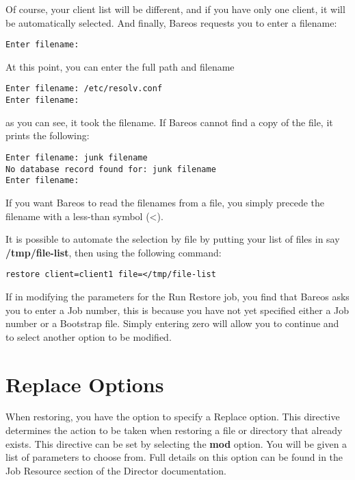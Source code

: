 Of course, your client list will be different, and if you have only one
client, it will be automatically selected. And finally, Bareos requests you to
enter a filename:

\footnotesize
\begin{verbatim}
Enter filename:
\end{verbatim}
\normalsize

At this point, you can enter the full path and filename

\footnotesize
\begin{verbatim}
Enter filename: /etc/resolv.conf
Enter filename:
\end{verbatim}
\normalsize

as you can see, it took the filename. If Bareos cannot find a copy of the
file, it prints the following:

\footnotesize
\begin{verbatim}
Enter filename: junk filename
No database record found for: junk filename
Enter filename:
\end{verbatim}
\normalsize

If you want Bareos to read the filenames from a file, you simply precede the
filename with a less-than symbol ({\textless}).

It is possible to automate the selection by file by putting your list of files
in say {\bf /tmp/file-list}, then using the following command:

\footnotesize
\begin{verbatim}
restore client=client1 file=</tmp/file-list
\end{verbatim}
\normalsize

If in modifying the parameters for the Run Restore job, you find that Bareos
asks you to enter a Job number, this is because you have not yet specified
either a Job number or a Bootstrap file. Simply entering zero will allow you
to continue and to select another option to be modified.

\label{Replace}

\section{Replace Options}

When restoring, you have the option to specify a Replace option.  This
directive determines the action to be taken when restoring a file or
directory that already exists.  This directive can be set by selecting
the {\bf mod} option.  You will be given a list of parameters to choose
from.  Full details on this option can be found in the Job Resource section
of the Director documentation.


